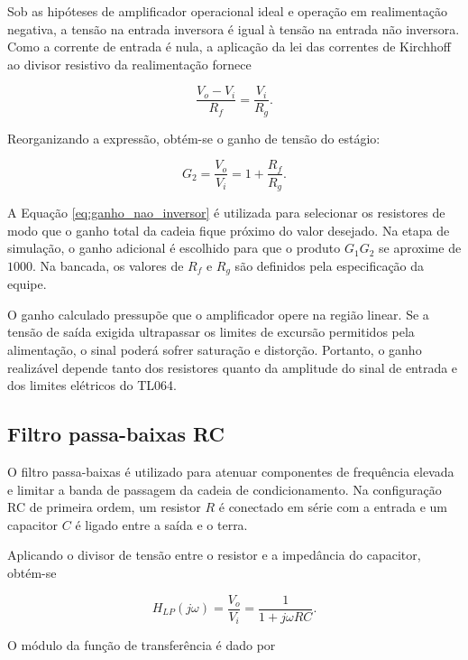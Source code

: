 \documentclass[11pt,a4paper]{article}
\begin{document}
Sob as hipóteses de amplificador operacional ideal e operação em realimentação negativa, a tensão na entrada inversora é igual à tensão na entrada não inversora. Como a corrente de entrada é nula, a aplicação da lei das correntes de Kirchhoff ao divisor resistivo da realimentação fornece

\begin{equation}
\frac{V_o-V_i}{R_f}=\frac{V_i}{R_g}.
\label{eq:kirchhoff_nao_inversor}
\end{equation}

Reorganizando a expressão, obtém-se o ganho de tensão do estágio:

\begin{equation}
G_2=\frac{V_o}{V_i}=1+\frac{R_f}{R_g}.
\label{eq:ganho_nao_inversor}
\end{equation}

A Equação \ref{eq:ganho_nao_inversor} é utilizada para selecionar os resistores de modo que o ganho total da cadeia fique próximo do valor desejado. Na etapa de simulação, o ganho adicional é escolhido para que o produto $G_1G_2$ se aproxime de $1000$. Na bancada, os valores de $R_f$ e $R_g$ são definidos pela especificação da equipe.

O ganho calculado pressupõe que o amplificador opere na região linear. Se a tensão de saída exigida ultrapassar os limites de excursão permitidos pela alimentação, o sinal poderá sofrer saturação e distorção. Portanto, o ganho realizável depende tanto dos resistores quanto da amplitude do sinal de entrada e dos limites elétricos do TL064.

\subsection{Filtro passa-baixas RC}

O filtro passa-baixas é utilizado para atenuar componentes de frequência elevada e limitar a banda de passagem da cadeia de condicionamento. Na configuração RC de primeira ordem, um resistor $R$ é conectado em série com a entrada e um capacitor $C$ é ligado entre a saída e o terra.

Aplicando o divisor de tensão entre o resistor e a impedância do capacitor, obtém-se

\begin{equation}
H_{LP}(j\omega)
=
\frac{V_o}{V_i}
=
\frac{1}{1+j\omega RC}.
\label{eq:funcao_passa_baixas}
\end{equation}

O módulo da função de transferência é dado por
\end{document}
